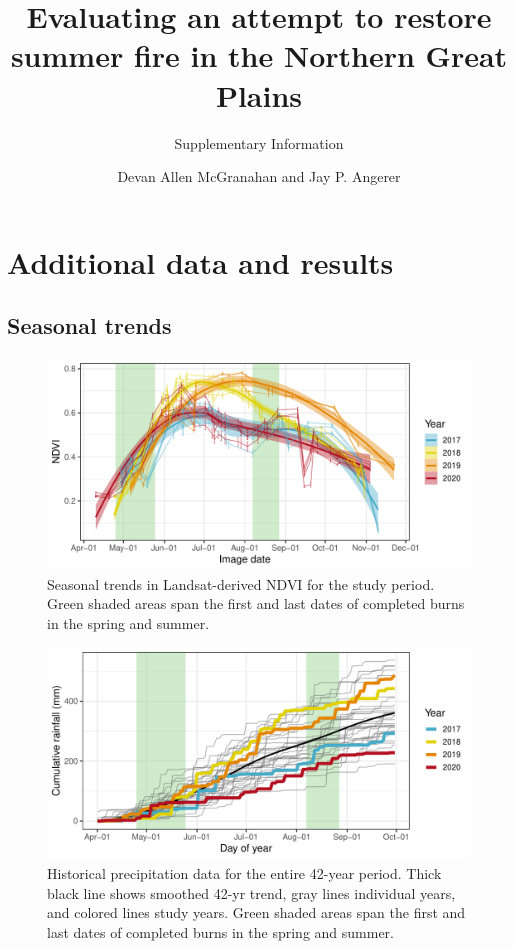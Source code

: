 \documentclass[
]{article}
\title{Evaluating an attempt to restore summer fire in the Northern
Great Plains}
\subtitle{Supplementary Information}
\author{Devan Allen McGranahan and Jay P. Angerer}
\date{}
\begin{document}
\maketitle

\section{Additional data and results}\label{additional-data-and-results}

\subsection{Seasonal trends}\label{seasonal-trends}

\begin{figure}
\centering
\includegraphics{SupplementalInformation_files/figure-latex/ndvi_trend-1.pdf}
\caption{Seasonal trends in Landsat-derived NDVI for the study period.
Green shaded areas span the first and last dates of completed burns in
the spring and summer.}
\end{figure}

\begin{figure}
\centering
\includegraphics{SupplementalInformation_files/figure-latex/precip_trend-1.pdf}
\caption{Historical precipitation data for the entire 42-year period.
Thick black line shows smoothed 42-yr trend, gray lines individual
years, and colored lines study years. Green shaded areas span the first
and last dates of completed burns in the spring and summer.}
\end{figure}
\end{document}

